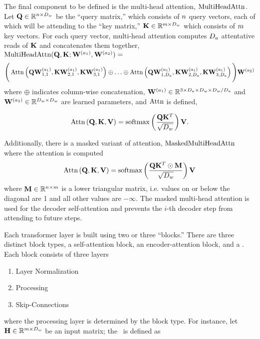 %


%  
The final component to be defined is the multi-head attention, $\operatorname{MultiHeadAttn}$.
Let $\mathbf{Q} \in \mathbb{R}^{n \times D_{w}}$ be the ``query matrix,''
which consists of $n$ query vectors, each of which will be attending
to the ``key matrix,'' $\mathbf{K} \in \mathbb{R}^{m \times D_{w}}$ which
consists of $m$ key vectors. For each query vector, multi-head attention
computes 
${D_a}$ attentative reads of $\mathbf{K}$ and concatenates them together,
\noindent $\operatorname{MultiHeadAttn}(\mathbf{Q}, \mathbf{K}; \mathbf{W}^{(a_1)}, \mathbf{W}^{(a_2)}) =$
\[ \Bigg(\operatorname{Attn}\left(\mathbf{Q}\mathbf{W}^{(a_1)}_{1,1}, \mathbf{K}\mathbf{W}^{(a_1)}_{2,1}, \mathbf{K} \mathbf{W}^{(a_1)}_{3,1} \right) \oplus 
      \ldots \oplus
  \operatorname{Attn}\left(\mathbf{Q}\mathbf{W}^{(a_1)}_{1,{D_a}}, \mathbf{K}\mathbf{W}^{(a_1)}_{2,{D_a}}, \mathbf{K} \mathbf{W}^{(a_1)}_{3,{D_a}} \right)\Bigg) \mathbf{W}^{(a_2)}
  \]
  where $\oplus$ indicates column-wise concatenation,  $\mathbf{W}^{(a_1)} \in \mathbb{R}^{3 \times {D_a} \times D_{w}\times D_{w} / {D_a}}$
  and $\mathbf{W}^{(a_2)} \in \mathbb{R}^{D_{w}\times D_{w}}$ are learned parameters,
  and  
$\operatorname{Attn}$ is defined,
  
  \[\operatorname{Attn}\left(\mathbf{Q}, \mathbf{K}, \mathbf{V}\right) = \operatorname*{softmax}\left(\frac{\mathbf{Q} \mathbf{K}^T}{\sqrt{D_{w}}} \right)\mathbf{V}. \]


  Additionally, there is a masked variant of attention, $\operatorname{MaskedMultiHeadAttn}$
  where the attention is computed 
  \[\operatorname{Attn}\left(\mathbf{Q}, \mathbf{K}, \mathbf{V}\right) = \operatorname*{softmax}\left(\frac{\mathbf{Q} \mathbf{K}^T \odot \mathbf{M} }{\sqrt{D_{w}}} \right)\mathbf{V} \]
where $\mathbf{M} \in \mathbb{R}^{n \times m}$ 
 is a lower triangular matrix, i.e. values on or below the diagonal are 1
  and all other values are $-\infty$.  The masked multi-head attention
  is used for the decoder self-attention and prevents the $i$-th decoder
  step from attending to future steps.

  Each transformer layer is built using two or three ``blocks.''
  There are three distinct block types, a self-attention block, an encoder-attention block, and a \feedforwardblock. Each block consists of three layers
    \begin{enumerate}
        \item Layer Normalization
        \item Processing
        \item Skip-Connections
    \end{enumerate}
    where the processing layer is determined by the block type. For instance,
    let $\mathbf{H} \in \mathbb{R}^{m \times D_{w}}$ be an input
    matrix; the \feedforwardblock~is defined as 

